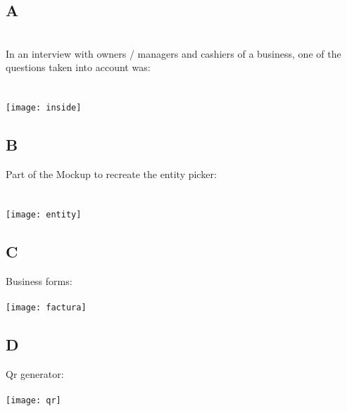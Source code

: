 \documentclass{article}
\begin{document}
\subsection{A}
\\In an interview with owners / managers and cashiers of a business, one of the questions taken into account was:\\\\\\
\texttt{[image: inside]}\par\vspace{1cm}

\subsection{B}
Part of the Mockup to recreate the entity picker:\\\\\\
\texttt{[image: entity]}\par\vspace{1cm}
	\vspace{2.0cm}
\subsection{C}
Business forms:\\\\
\texttt{[image: factura]}\par\vspace{1cm}
	\vspace{2.0cm}

\subsection{D}
Qr generator:\\\\
\texttt{[image: qr]}\par\vspace{1cm}

	\vspace{2.0cm}
\end{document}
